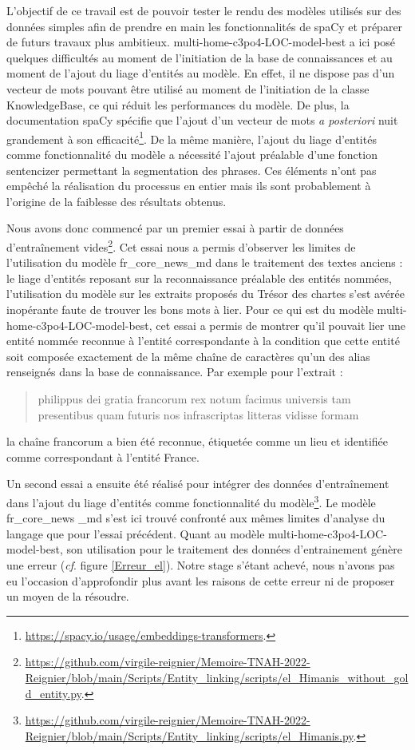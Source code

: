 \documentclass[a4paper,12pt,twoside]{book}
\begin{document}
	L'objectif de ce travail est de pouvoir tester le rendu des modèles utilisés sur des données simples afin de prendre en main les fonctionnalités de spaCy et préparer de futurs travaux plus ambitieux. \og multi-home-c3po4-LOC-model-best\fg{} a ici posé quelques difficultés au moment de l'initiation de la base de connaissances et au moment de l'ajout du liage d'entités au modèle. En effet, il ne dispose pas d'un vecteur de mots pouvant être utilisé au moment de l'initiation de la classe \og KnowledgeBase\fg{}, ce qui réduit les performances du modèle. De plus, la documentation spaCy spécifie que l'ajout d'un vecteur de mots \textit{a posteriori} nuit grandement à son efficacité\footnote{\url{https://spacy.io/usage/embeddings-transformers}.}. De la même manière, l'ajout du liage d'entités comme fonctionnalité du modèle a nécessité l'ajout préalable d'une fonction \og sentencizer\fg{} permettant la segmentation des phrases. Ces éléments n'ont pas empêché la réalisation du processus en entier mais ils sont probablement à l'origine de la faiblesse des résultats obtenus. 
	
	Nous avons donc commencé par un premier essai à partir de données d'entraînement vides\footnote{\url{https://github.com/virgile-reignier/Memoire-TNAH-2022-Reignier/blob/main/Scripts/Entity_linking/scripts/el_Himanis_without_gold_entity.py}.}. Cet essai nous a permis d'observer les limites de l'utilisation du modèle \og fr\_core\_news\_md\fg{} dans le traitement des textes anciens : le liage d'entités reposant sur la reconnaissance préalable des entités nommées, l'utilisation du modèle sur les extraits proposés du Trésor des chartes s'est avérée inopérante faute de trouver les bons mots à lier. Pour ce qui est du modèle \og multi-home-c3po4-LOC-model-best\fg{}, cet essai a permis de montrer qu'il pouvait lier une entité nommée reconnue à l'entité correspondante à la condition que cette entité soit composée exactement de la même chaîne de caractères qu'un des alias renseignés dans la base de connaissance. Par exemple pour l'extrait :
	
	\begin{quotation}
		philippus dei gratia francorum rex notum facimus universis tam presentibus quam futuris nos infrascriptas litteras vidisse formam
	\end{quotation}

	\noindent la chaîne \og francorum\fg{} a bien été reconnue, étiquetée comme un lieu et identifiée comme correspondant à l'entité France.
	
	Un second essai a ensuite été réalisé pour intégrer des données d'entraînement dans l'ajout du liage d'entités comme fonctionnalité du modèle\footnote{\url{https://github.com/virgile-reignier/Memoire-TNAH-2022-Reignier/blob/main/Scripts/Entity_linking/scripts/el_Himanis.py}.}. Le modèle \og fr\_core\_news \_md\fg{} s'est ici trouvé confronté aux mêmes limites d'analyse du langage que pour l'essai précédent. Quant au modèle \og multi-home-c3po4-LOC-model-best\fg{}, son utilisation pour le traitement des données d'entrainement génère une erreur (\textit{cf}. figure \ref{Erreur_el}). Notre stage s'étant achevé, nous n'avons pas eu l'occasion d'approfondir plus avant les raisons de cette erreur ni de proposer un moyen de la résoudre. 
	
\end{document}
